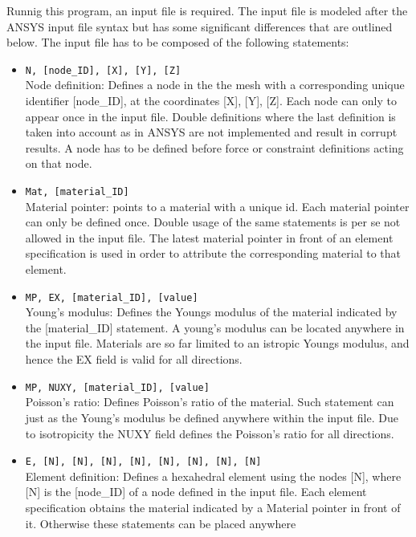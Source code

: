 Runnig this program, an input file is required. The input file is
modeled after the ANSYS input file syntax but has some significant
differences that are outlined below.
The input file has to be composed of the following statements:
\begin{itemize}
\item {\tt N, [node\_ID], [X], [Y], [Z]} \\
      Node definition: Defines a node in the the mesh with a
      corresponding unique identifier
      [node\_ID], at the coordinates [X], [Y], [Z].
      Each node can only to appear once in the input file. Double
      definitions where the last definition is taken into account as
      in ANSYS are not implemented and result in corrupt results. A
      node has to be defined before
      force or constraint definitions acting on that node. 
\item {\tt Mat, [material\_ID]} \\
      Material pointer: points to a material with a unique id. Each
      material pointer can only be defined once. Double usage of the
      same statements is per se not allowed in the input file. The
      latest material pointer in front of an
      element specification is used in order to attribute the
      corresponding material to that element.
\item {\tt MP, EX, [material\_ID], [value]} \\
      Young's modulus: Defines the Youngs modulus of the material
      indicated by the [material\_ID] statement. A young's modulus
      can be located anywhere in the input file. Materials are so far
      limited to an istropic Youngs modulus, and hence the EX field
      is valid for all directions.
\item {\tt MP, NUXY, [material\_ID], [value]} \\
      Poisson's ratio: Defines Poisson's ratio of the
      material. Such statement can
      just as the Young's modulus be defined anywhere within the input
      file. Due to isotropicity
      the NUXY field defines the Poisson's ratio for all directions.
\item {\tt E, [N], [N], [N], [N], [N], [N], [N], [N]} \\
      Element definition: Defines a hexahedral element using the nodes
      [N], where [N] is the [node\_ID] of a node defined in the input
      file. Each element 
      specification obtains the material indicated by a Material
      pointer in front of it. Otherwise these statements can be placed anywhere

\end{itemize}
